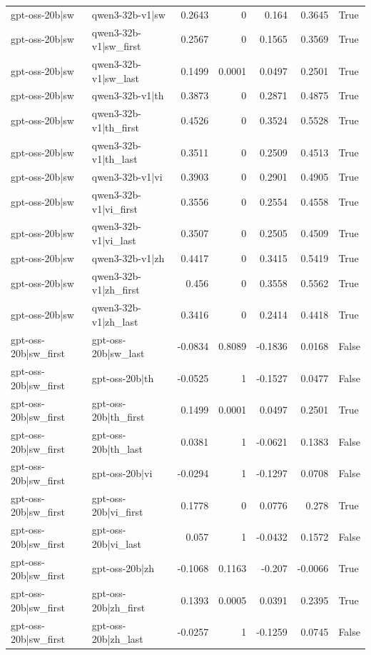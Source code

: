 \begin{table}
\begin{tabular}{l l r r r r l}
gpt-oss-20b|sw & qwen3-32b-v1|sw & 0.2643 & 0 & 0.164 & 0.3645 & True \\
gpt-oss-20b|sw & qwen3-32b-v1|sw_first & 0.2567 & 0 & 0.1565 & 0.3569 & True \\
gpt-oss-20b|sw & qwen3-32b-v1|sw_last & 0.1499 & 0.0001 & 0.0497 & 0.2501 & True \\
gpt-oss-20b|sw & qwen3-32b-v1|th & 0.3873 & 0 & 0.2871 & 0.4875 & True \\
gpt-oss-20b|sw & qwen3-32b-v1|th_first & 0.4526 & 0 & 0.3524 & 0.5528 & True \\
gpt-oss-20b|sw & qwen3-32b-v1|th_last & 0.3511 & 0 & 0.2509 & 0.4513 & True \\
gpt-oss-20b|sw & qwen3-32b-v1|vi & 0.3903 & 0 & 0.2901 & 0.4905 & True \\
gpt-oss-20b|sw & qwen3-32b-v1|vi_first & 0.3556 & 0 & 0.2554 & 0.4558 & True \\
gpt-oss-20b|sw & qwen3-32b-v1|vi_last & 0.3507 & 0 & 0.2505 & 0.4509 & True \\
gpt-oss-20b|sw & qwen3-32b-v1|zh & 0.4417 & 0 & 0.3415 & 0.5419 & True \\
gpt-oss-20b|sw & qwen3-32b-v1|zh_first & 0.456 & 0 & 0.3558 & 0.5562 & True \\
gpt-oss-20b|sw & qwen3-32b-v1|zh_last & 0.3416 & 0 & 0.2414 & 0.4418 & True \\
gpt-oss-20b|sw_first & gpt-oss-20b|sw_last & -0.0834 & 0.8089 & -0.1836 & 0.0168 & False \\
gpt-oss-20b|sw_first & gpt-oss-20b|th & -0.0525 & 1 & -0.1527 & 0.0477 & False \\
gpt-oss-20b|sw_first & gpt-oss-20b|th_first & 0.1499 & 0.0001 & 0.0497 & 0.2501 & True \\
gpt-oss-20b|sw_first & gpt-oss-20b|th_last & 0.0381 & 1 & -0.0621 & 0.1383 & False \\
gpt-oss-20b|sw_first & gpt-oss-20b|vi & -0.0294 & 1 & -0.1297 & 0.0708 & False \\
gpt-oss-20b|sw_first & gpt-oss-20b|vi_first & 0.1778 & 0 & 0.0776 & 0.278 & True \\
gpt-oss-20b|sw_first & gpt-oss-20b|vi_last & 0.057 & 1 & -0.0432 & 0.1572 & False \\
gpt-oss-20b|sw_first & gpt-oss-20b|zh & -0.1068 & 0.1163 & -0.207 & -0.0066 & True \\
gpt-oss-20b|sw_first & gpt-oss-20b|zh_first & 0.1393 & 0.0005 & 0.0391 & 0.2395 & True \\
gpt-oss-20b|sw_first & gpt-oss-20b|zh_last & -0.0257 & 1 & -0.1259 & 0.0745 & False \\

\end{tabular}
\end{table}
